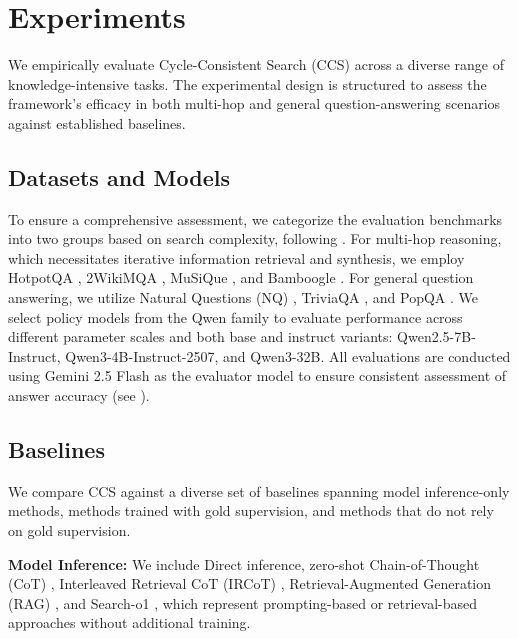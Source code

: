 \section{Experiments}
\label{sec:experiments}

We empirically evaluate Cycle-Consistent Search (CCS) across a diverse range of knowledge-intensive tasks. The experimental design is structured to assess the framework's efficacy in both multi-hop and general question-answering scenarios against established baselines.

\subsection{Datasets and Models} 
To ensure a comprehensive assessment, we categorize the evaluation benchmarks into two groups based on search complexity, following \citet{search-r1}. For multi-hop reasoning, which necessitates iterative information retrieval and synthesis, we employ HotpotQA \citep{hotpotqa}, 2WikiMQA \citep{2wikimqa}, MuSiQue \citep{musique}, and Bamboogle \citep{bamboogle}. For general question answering, we utilize Natural Questions (NQ) \citep{nq}, TriviaQA \citep{triviaqa}, and PopQA \citep{popqa}.
We select policy models from the Qwen family \citep{yang2025qwen3} to evaluate performance across different parameter scales and both base and instruct variants: Qwen2.5-7B-Instruct, Qwen3-4B-Instruct-2507, and Qwen3-32B. All evaluations are conducted using Gemini 2.5 Flash \citep{comanici2025gemini} as the evaluator model to ensure consistent assessment of answer accuracy (see ).


\subsection{Baselines} 
We compare CCS against a diverse set of baselines spanning model inference-only methods, methods trained with gold supervision, and methods that do not rely on gold supervision.

\textbf{Model Inference:} We include Direct inference, zero-shot Chain-of-Thought (CoT) \citep{cot}, Interleaved Retrieval CoT (IRCoT) \citep{ircot}, Retrieval-Augmented Generation (RAG) \citep{rag}, and Search-o1 \citep{search-o1}, which represent prompting-based or retrieval-based approaches without additional training.

